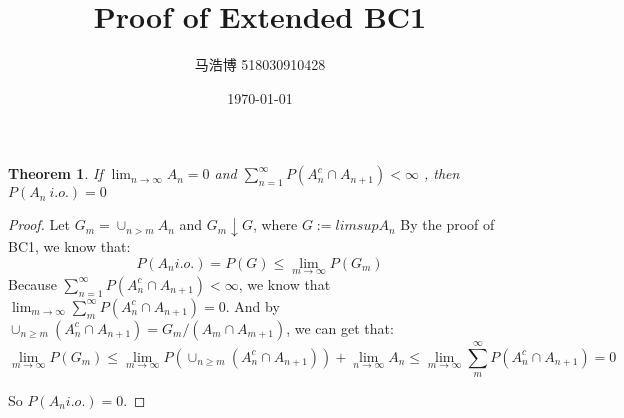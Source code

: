\documentclass[12pt]{article}
\title{Proof of Extended BC1}
\author{马浩博 518030910428}
\date{\today}
\theoremstyle{mythm}
\newtheorem{theorem}{Theorem}
\begin{document}
\maketitle

  \begin{theorem}
  If $\lim_{n\to \infty}A_n=0$ and $\sum_{n = 1}^{\infty}P(A_n^c\cap A_{n+1})<\infty$ , then $P(A_n\ i.o.)=0$
  \end{theorem}
    
\begin{proof}
Let $G_m=\cup_{n>m} A_n$ and $G_m \downarrow G$, where $G := lim sup A_n$
By the proof of BC1, we know that: 
$$P(A_n i.o.)=P(G) \leq \lim_{m\to \infty}P(G_m)$$
Because $\sum_{n = 1}^{\infty}P(A_n^c\cap A_{n+1})<\infty$, we know that $\lim_{m\to \infty}\sum_{m}^{\infty}P(A_n^c\cap A_{n+1})=0$.
And by $\cup_{n\geq m} (A_n^c\cap A_{n+1})=G_m/(A_m\cap A_{m+1})$, we can get that:
$$\lim_{m\to \infty}P(G_m) \leq \lim_{m\to \infty}P(\cup_{n\geq m} (A_n^c\cap A_{n+1}))+\lim_{n\to \infty}A_n \leq \lim_{m\to \infty}\sum_{m}^{\infty}P(A_n^c\cap A_{n+1})=0$$

So $P(A_n i.o.)=0$.
\end{proof} 
\end{document}
